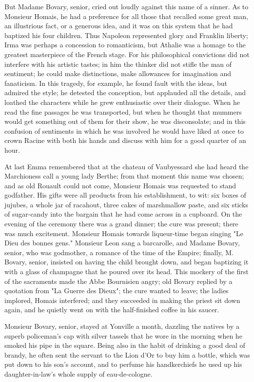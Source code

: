 \documentclass[11pt,twocolumn]{ltugboat}
\begin{document}
But Madame Bovary, senior, cried out loudly against this name of a
sinner. As to Monsieur Homais, he had a preference for all those that
recalled some great man, an illustrious fact, or a generous idea, and it
was on this system that he had baptized his four children. Thus Napoleon
represented glory and Franklin liberty; Irma was perhaps a concession to
romanticism, but Athalie was a homage to the greatest masterpiece of the
French stage. For his philosophical convictions did not interfere
with his artistic tastes; in him the thinker did not stifle the man of
sentiment; he could make distinctions, make allowances for imagination
and fanaticism. In this tragedy, for example, he found fault with the
ideas, but admired the style; he detested the conception, but applauded
all the details, and loathed the characters while he grew enthusiastic
over their dialogue. When he read the fine passages he was transported,
but when he thought that mummers would get something out of them for
their show, he was disconsolate; and in this confusion of sentiments in
which he was involved he would have liked at once to crown Racine with
both his hands and discuss with him for a good quarter of an hour.

At last Emma remembered that at the chateau of Vaubyessard she had heard
the Marchioness call a young lady Berthe; from that moment this name was
chosen; and as old Rouault could not come, Monsieur Homais was requested
to stand godfather. His gifts were all products from his establishment,
to wit: six boxes of jujubes, a whole jar of racahout, three cakes of
marshmallow paste, and six sticks of sugar-candy into the bargain that
he had come across in a cupboard. On the evening of the ceremony there
was a grand dinner; the cure was present; there was much excitement.
Monsieur Homais towards liqueur-time began singing "Le Dieu des bonnes
gens." Monsieur Leon sang a barcarolle, and Madame Bovary, senior, who
was godmother, a romance of the time of the Empire; finally, M. Bovary,
senior, insisted on having the child brought down, and began baptizing
it with a glass of champagne that he poured over its head. This mockery
of the first of the sacraments made the Abbe Bournisien angry; old
Bovary replied by a quotation from "La Guerre des Dieux"; the cure
wanted to leave; the ladies implored, Homais interfered; and they
succeeded in making the priest sit down again, and he quietly went on
with the half-finished coffee in his saucer.

Monsieur Bovary, senior, stayed at Yonville a month, dazzling the
natives by a superb policeman's cap with silver tassels that he wore
in the morning when he smoked his pipe in the square. Being also in the
habit of drinking a good deal of brandy, he often sent the servant
to the Lion d'Or to buy him a bottle, which was put down to his
son's account, and to perfume his handkerchiefs he used up his
daughter-in-law's whole supply of eau-de-cologne.
\end{document}
